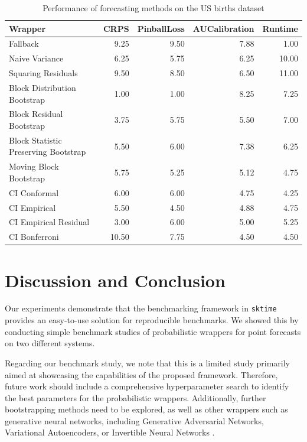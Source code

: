 \begin{table}[h]
    \centering
    \caption{Performance of forecasting methods on the US births dataset}
    \label{table:us_births_results}
\begin{tabular}{lrrrr}
\toprule
Wrapper & CRPS & PinballLoss & AUCalibration & Runtime \\
\midrule
Fallback & 9.25 & 9.50 & 7.88 & 1.00 \\
Naive Variance & 6.25 & 5.75 & 6.25 & 10.00 \\
Squaring Residuals & 9.50 & 8.50 & 6.50 & 11.00 \\
Block Distribution Bootstrap & 1.00 & 1.00 & 8.25 & 7.25 \\
Block Residual Bootstrap & 3.75 & 5.75 & 5.50 & 7.00 \\
Block Statistic Preserving Bootstrap & 5.50 & 6.00 & 7.38 & 6.25 \\
Moving Block Bootstrap & 5.75 & 5.25 & 5.12 & 4.75 \\
CI Conformal & 6.00 & 6.00 & 4.75 & 4.25 \\
CI Empirical & 5.50 & 4.50 & 4.88 & 4.75 \\
CI Empirical Residual & 3.00 & 6.00 & 5.00 & 5.25 \\
CI Bonferroni  & 10.50 & 7.75 & 4.50 & 4.50 \\
\bottomrule
\end{tabular}

\end{table}


\section{Discussion and Conclusion} \label{conclusion}
Our experiments demonstrate that the benchmarking framework in \texttt{sktime} provides an easy-to-use solution for reproducible benchmarks. We showed this by conducting simple benchmark studies of probabilistic wrappers for point forecasts on two different systems.

Regarding our benchmark study, we note that this is a limited study primarily aimed at showcasing the capabilities of the proposed framework. Therefore, future work should include a comprehensive hyperparameter search to identify the best parameters for the probabilistic wrappers. Additionally, further bootstrapping methods need to be explored, as well as other wrappers such as generative neural networks, including Generative Adversarial Networks, Variational Autoencoders, or Invertible Neural Networks \cite{phipps2024, wang2020}.

